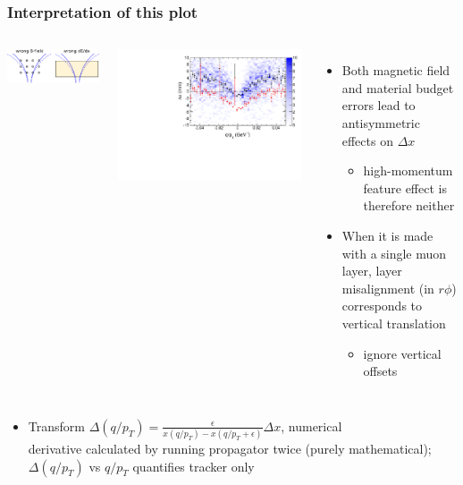 \documentclass[compress]{beamer}
\begin{document}
\begin{frame}
\frametitle{Interpretation of this plot}

\begin{columns}
\includegraphics[width=\linewidth]{things_that_are_antisymmetric.pdf}

\includegraphics[width=\linewidth]{residuals_real_both.pdf}
\begin{itemize}
\item Both magnetic field and material budget errors lead to antisymmetric effects on $\Delta x$
\begin{itemize}
\item high-momentum feature effect is therefore neither
\end{itemize}
\item When it is made with a single muon layer, layer misalignment (in
  $r\phi$) corresponds to vertical translation
\begin{itemize}
\item ignore vertical offsets
\end{itemize}
\end{itemize}
\end{columns}

\begin{itemize}
\item Transform $\displaystyle \Delta(q/p_T) = \frac{\epsilon}{x(q/p_T)
  - x(q/p_T + \epsilon)} \Delta x$, numerical \\ \vspace{0.2 cm} derivative calculated by
  running propagator twice (purely mathematical); $\Delta(q/p_T)$ vs $q/p_T$ quantifies tracker only
\end{itemize}
\end{frame}
\end{document}
